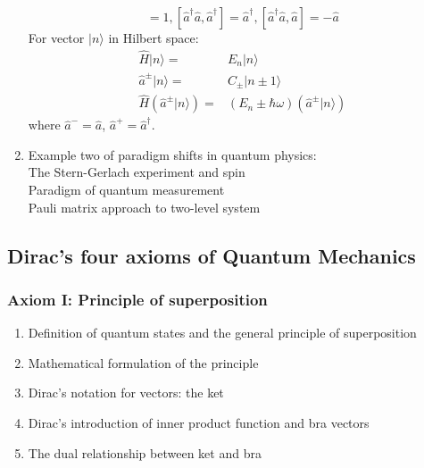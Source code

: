 \documentclass[12pt]{article}
\numberwithin{equation}{section}
\begin{document}
\begin{enumerate}
	\begin{equation}[\hat{a},\hat{a}^\dag]=1,[\hat{a}^\dag\hat{a},\hat{a}^\dag]=\hat{a}^\dag,
	 [\hat{a}^\dag\hat{a},\hat{a}]=-\hat{a}\end{equation}
	 For vector $|n\rangle$ in Hilbert space:
	 \begin{equation}\begin{split}
	 \hat{H}|n\rangle=&E_n|n\rangle \\
	 \hat{a}^\pm|n\rangle=&C_\pm|n\pm1\rangle \\
	 \hat{H}(\hat{a}^\pm|n\rangle)=&(E_n\pm\hbar\omega)(\hat{a}^\pm|n\rangle)
	 \end{split}\end{equation}
	 where $\hat{a}^-=\hat{a}$, $\hat{a}^+=\hat{a}^\dag$.
\item Example two of paradigm shifts in quantum physics: \\
	The Stern-Gerlach experiment and spin\\
	Paradigm of quantum measurement \\
	Pauli matrix approach to two-level system
\end{enumerate}
\subsection{Dirac's four axioms of Quantum Mechanics}
\subsubsection{Axiom I: Principle of superposition}
\begin{enumerate}
\item Definition of quantum states and the general principle of superposition
\item Mathematical formulation of the principle
\item Dirac's notation for vectors: the ket
\item Dirac's introduction of inner product function and bra vectors
\item The dual relationship between ket and bra
\end{enumerate}
\end{document}
